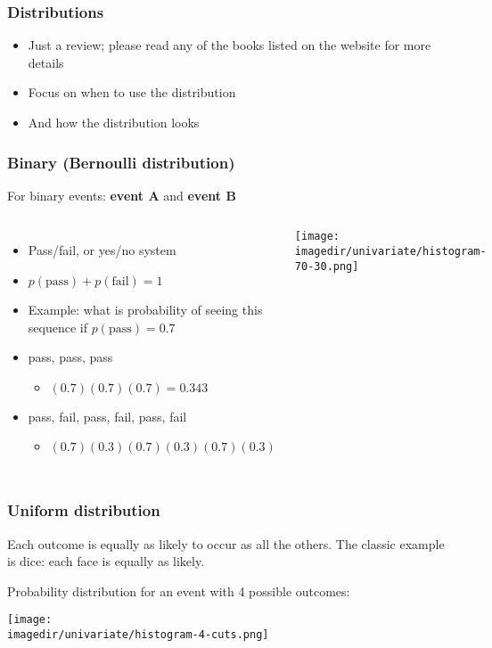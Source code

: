 \begin{frame}\frametitle{Distributions}
	\begin{itemize}
		\item Just a review; please read any of the books listed on the website for more details
		\item Focus on when to use the distribution
		\item And how the distribution looks
	\end{itemize}
\end{frame}

\begin{frame}\frametitle{Binary (Bernoulli distribution)}
	For binary events: \textbf{event A} and \textbf{event B}
	\begin{columns}
		\column{6cm}
		\begin{itemize}
			\item Pass/fail, or yes/no system
			\item $p(\text{pass}) + p(\text{fail}) = 1$
			\item Example: what is probability of seeing this sequence if $p(\text{pass}) = 0.7$
			\item pass, pass, pass
			\begin{itemize}
				\item $(0.7)(0.7)(0.7) = 0.343$
			\end{itemize}
			\item pass, fail, pass, fail, pass, fail
			\begin{itemize}
				\item $(0.7)(0.3)(0.7)(0.3)(0.7)(0.3)$
			\end{itemize}
		\end{itemize}
		\column{5cm}
		\texttt{[image: \\imagedir/univariate/histogram-70-30.png]}
	\end{columns}
\end{frame}

\begin{frame}\frametitle{Uniform distribution}
	Each outcome is equally as likely to occur as all the others. The classic example is dice: each face is equally as likely.

	Probability distribution for an event with 4 possible outcomes:
	\begin{center}
		\texttt{[image: \\imagedir/univariate/histogram-4-cuts.png]}
	\end{center}
\end{frame}

